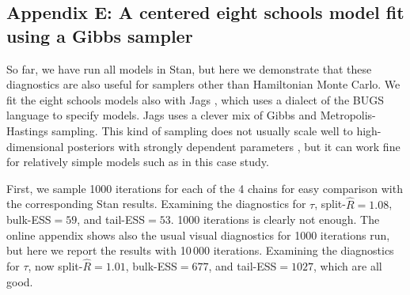 \documentclass[american,]{article}
\theoremstyle{definition}
\begin{document}
\hypertarget{eight-schools-with-jags}{%
\subsection*{Appendix E: A centered eight schools model fit using a Gibbs sampler}\label{eight-schools-with-jags}}

So far, we have run all models in Stan, but here we demonstrate that
these diagnostics are  also useful for samplers other than 
Hamiltonian Monte Carlo.  We fit the eight schools models also with
 Jags \citep{plummer2003jags}, which uses a dialect of the BUGS
language \citep{lunn2009bugs} to specify models. Jags uses a clever
mix of Gibbs and Metropolis-Hastings sampling. This kind of sampling
does not usually scale well to high-dimensional posteriors with strongly
dependent parameters \citep[see, e.g.][]{Hoffman+Gelman:2014}, but it can work fine for relatively simple models such as in this case study.


First, we sample 1000 iterations for each of the 4 chains for easy
comparison with the corresponding Stan results. Examining the
diagnostics for $\tau$, split-\(\widehat{R}=1.08\), bulk-ESS$=59$, and
tail-ESS$=53$. 1000 iterations is clearly not enough. The online
appendix shows also the usual visual diagnostics for 1000 iterations
run, but here we report the results with 10\,000 iterations.
Examining the diagnostics for $\tau$, now split-\(\widehat{R}=1.01\),
bulk-ESS$=677$, and tail-ESS$=1027$, which are all good.
\end{document}
